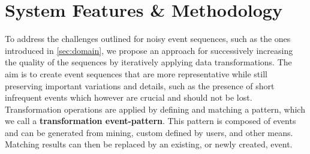 \documentclass[camera]{vgtc}                          %
\begin{document}
\section{System Features \& Methodology}
\label{sec:system-feature}
To address the challenges outlined for noisy event sequences, such as the ones introduced in \autoref{sec:domain}, we propose an approach for successively increasing the quality of the sequences by iteratively applying data transformations. 
The aim is to create event sequences that are more representative while still preserving important variations and details, such as the presence of short infrequent events which however are crucial and should not be lost.
Transformation operations are applied by defining and matching a pattern, which we call a \textbf{transformation event-pattern}. This pattern is composed of events and can be generated from mining, custom defined by users, and other means.
Matching results can then be replaced by an existing, or newly created, event. 
\end{document}
